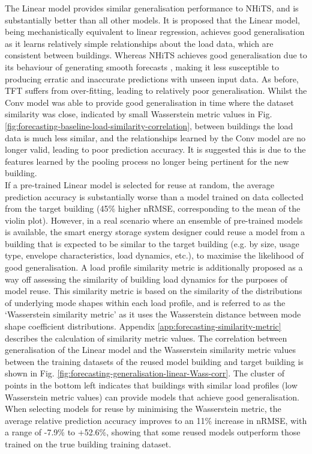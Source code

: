 The Linear model provides similar generalisation performance to NHiTS, and is substantially better than all other models. It is proposed that the Linear model, being mechanistically equivalent to linear regression, achieves good generalisation as it learns relatively simple relationships about the load data, which are consistent between buildings. Whereas NHiTS achieves good generalisation due to its behaviour of generating smooth forecasts \citep{challu2023NHITSNeuralHierarchical}, making it less susceptible to producing erratic and inaccurate predictions with unseen input data. As before, TFT suffers from over-fitting, leading to relatively poor generalisation. Whilst the Conv model was able to provide good generalisation in time where the dataset similarity was close, indicated by small Wasserstein metric values in Fig. \ref{fig:forecasting-baseline-load-similarity-correlation}, between buildings the load data is much less similar, and the relationships learned by the Conv model are no longer valid, leading to poor prediction accuracy. It is suggested this is due to the features learned by the pooling process no longer being pertinent for the new building.\\

If a pre-trained Linear model is selected for reuse at random, the average prediction accuracy is substantially worse than a model trained on data collected from the target building (45\% higher nRMSE, corresponding to the mean of the violin plot). However, in a real scenario where an ensemble of pre-trained models is available, the smart energy storage system designer could reuse a model from a building that is expected to be similar to the target building (e.g. by size, usage type, envelope characteristics, load dynamics, etc.), to maximise the likelihood of good generalisation. A load profile similarity metric is additionally proposed as a way off assessing the similarity of building load dynamics for the purposes of model reuse. This similarity metric is based on the similarity of the distributions of underlying mode shapes within each load profile, and is referred to as the `Wasserstein similarity metric' as it uses the Wasserstein distance between mode shape coefficient distributions. Appendix \ref{app:forecasting-similarity-metric} describes the calculation of similarity metric values. The correlation between generalisation of the Linear model and the Wasserstein similarity metric values between the training datasets of the reused model building and target building is shown in Fig. \ref{fig:forecasting-generalisation-linear-Wass-corr}. The cluster of points in the bottom left indicates that buildings with similar load profiles (low Wasserstein metric values) can provide models that achieve good generalisation. When selecting models for reuse by minimising the Wasserstein metric, the average relative prediction accuracy improves to an 11\% increase in nRMSE, with a range of -7.9\% to +52.6\%, showing that some reused models outperform those trained on the true building training dataset.

